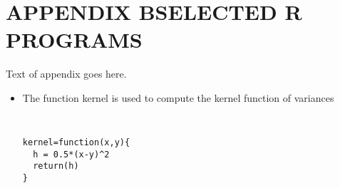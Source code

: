 \chapter{\texorpdfstring{APPENDIX B\hspace{1em}SELECTED R PROGRAMS}{APPENDIX B}}

Text of appendix goes here.

\begin{itemize}
\item The function kernel is used to compute the kernel function of variances
{\small \tt
\begin{verbatim}
kernel=function(x,y){
  h = 0.5*(x-y)^2
  return(h)
}
\end{verbatim}
}
\end{itemize}
